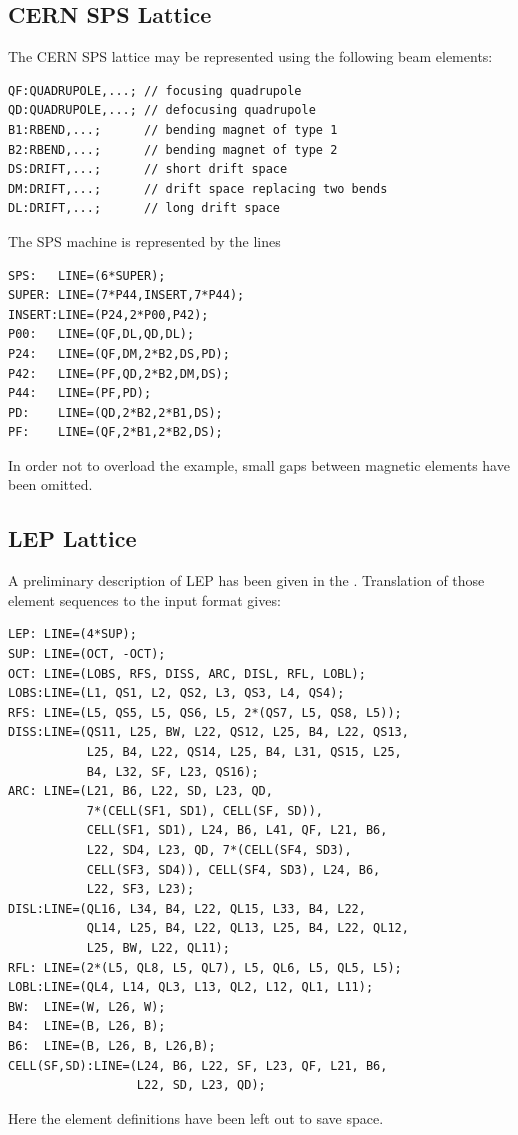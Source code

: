\clearpage
\subsection{CERN SPS Lattice}
\label{sec:sps}
The CERN SPS lattice may be represented using the following beam elements:
\begin{verbatim}
QF:QUADRUPOLE,...; // focusing quadrupole
QD:QUADRUPOLE,...; // defocusing quadrupole
B1:RBEND,...;      // bending magnet of type 1
B2:RBEND,...;      // bending magnet of type 2
DS:DRIFT,...;      // short drift space
DM:DRIFT,...;      // drift space replacing two bends
DL:DRIFT,...;      // long drift space
\end{verbatim}
The SPS machine is represented by the lines
\begin{verbatim}
SPS:   LINE=(6*SUPER);
SUPER: LINE=(7*P44,INSERT,7*P44);
INSERT:LINE=(P24,2*P00,P42);
P00:   LINE=(QF,DL,QD,DL);
P24:   LINE=(QF,DM,2*B2,DS,PD);
P42:   LINE=(PF,QD,2*B2,DM,DS);
P44:   LINE=(PF,PD);
PD:    LINE=(QD,2*B2,2*B1,DS);
PF:    LINE=(QF,2*B1,2*B2,DS);
\end{verbatim}
In order not to overload the example,
small gaps between magnetic elements have been omitted.

\subsection{LEP Lattice}
\label{sec:lep}
A preliminary description of LEP has been given in the
.
Translation of those element sequences to the \opal input format gives:
\begin{verbatim}
LEP: LINE=(4*SUP);
SUP: LINE=(OCT, -OCT);
OCT: LINE=(LOBS, RFS, DISS, ARC, DISL, RFL, LOBL);
LOBS:LINE=(L1, QS1, L2, QS2, L3, QS3, L4, QS4);
RFS: LINE=(L5, QS5, L5, QS6, L5, 2*(QS7, L5, QS8, L5));
DISS:LINE=(QS11, L25, BW, L22, QS12, L25, B4, L22, QS13, 
           L25, B4, L22, QS14, L25, B4, L31, QS15, L25,
           B4, L32, SF, L23, QS16);
ARC: LINE=(L21, B6, L22, SD, L23, QD,
           7*(CELL(SF1, SD1), CELL(SF, SD)), 
           CELL(SF1, SD1), L24, B6, L41, QF, L21, B6, 
           L22, SD4, L23, QD, 7*(CELL(SF4, SD3), 
           CELL(SF3, SD4)), CELL(SF4, SD3), L24, B6, 
           L22, SF3, L23);
DISL:LINE=(QL16, L34, B4, L22, QL15, L33, B4, L22,
           QL14, L25, B4, L22, QL13, L25, B4, L22, QL12,
           L25, BW, L22, QL11);
RFL: LINE=(2*(L5, QL8, L5, QL7), L5, QL6, L5, QL5, L5);
LOBL:LINE=(QL4, L14, QL3, L13, QL2, L12, QL1, L11);
BW:  LINE=(W, L26, W);
B4:  LINE=(B, L26, B);
B6:  LINE=(B, L26, B, L26,B);
CELL(SF,SD):LINE=(L24, B6, L22, SF, L23, QF, L21, B6,
                  L22, SD, L23, QD);
\end{verbatim}
Here the element definitions have been left out to save space.
